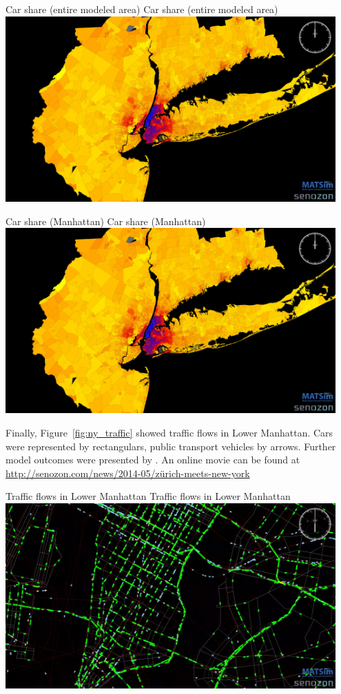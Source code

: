 \createfigure%
{Car share (entire modeled area)}%
{Car share (entire modeled area)}%
{\label{fig:ny_car_share_full}}%
{\includegraphics[width=0.95\textwidth, angle=0]{./using/figures/ny_carshare_TAZ_full.png}}%
{}

\createfigure%
{Car share (Manhattan)}%
{Car share (Manhattan)}%
{\label{fig:ny_car_share_gross}}%
{\includegraphics[width=0.95\textwidth, angle=0]{./using/figures/ny_carshare_TAZ_full.png}}%
{}

Finally, Figure~\ref{fig:ny_traffic} showed traffic flows in Lower Manhattan. Cars were represented by rectangulars, public transport vehicles by arrows. Further model outcomes were presented by \citet[][]{Balmer_unpub_ZMNY_2014}. An online movie can be found at \url{http://senozon.com/news/2014-05/zürich-meets-new-york}

\createfigure%
{Traffic flows in Lower Manhattan}%
{Traffic flows in Lower Manhattan}%
{\label{fig:ny_traffic}}%
{\includegraphics[width=0.95\textwidth, angle=0]{./using/figures/ny_traffic.png}}%
{}


